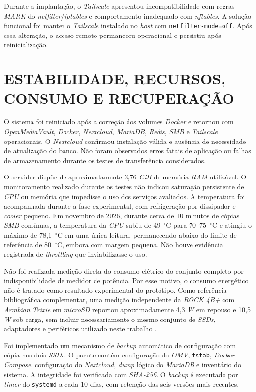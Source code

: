 Durante a implantação, o \textit{Tailscale} apresentou incompatibilidade com regras \textit{MARK} do \textit{netfilter}/\textit{iptables} e comportamento inadequado com \textit{nftables}. A solução funcional foi manter o \textit{Tailscale} instalado no \textit{host} com \texttt{netfilter-mode=off}. Após essa alteração, o acesso remoto permaneceu operacional e persistiu após reinicialização.

\section{ESTABILIDADE, RECURSOS, CONSUMO E RECUPERAÇÃO}

O sistema foi reiniciado após a correção dos volumes \textit{Docker} e retornou com \textit{OpenMediaVault}, \textit{Docker}, \textit{Nextcloud}, \textit{MariaDB}, \textit{Redis}, \textit{SMB} e \textit{Tailscale} operacionais. O \textit{Nextcloud} confirmou instalação válida e ausência de necessidade de atualização do banco. Não foram observados erros fatais de aplicação ou falhas de armazenamento durante os testes de transferência considerados.

O servidor dispõe de aproximadamente 3,76 \textit{GiB} de memória \textit{RAM} utilizável. O monitoramento realizado durante os testes não indicou saturação persistente de \textit{CPU} ou memória que impedisse o uso dos serviços avaliados. A temperatura foi acompanhada durante a fase experimental, com refrigeração por dissipador e \textit{cooler} pequeno. Em novembro de 2026, durante cerca de 10 minutos de cópias \textit{SMB} contínuas, a temperatura da \textit{CPU} subiu de 49~$^\circ$C para 70--75~$^\circ$C e atingiu o máximo de 78,1~$^\circ$C em uma única leitura, permanecendo abaixo do limite de referência de 80~$^\circ$C, embora com margem pequena. Não houve evidência registrada de \textit{throttling} que inviabilizasse o uso.

Não foi realizada medição direta do consumo elétrico do conjunto completo por indisponibilidade de medidor de potência. Por esse motivo, o consumo energético não é tratado como resultado experimental do protótipo. Como referência bibliográfica complementar, uma medição independente da \textit{ROCK 4B+} com \textit{Armbian Trixie} em \textit{microSD} reportou aproximadamente 4,3 \textit{W} em repouso e 10,5 \textit{W} sob carga, sem incluir necessariamente o mesmo conjunto de \textit{SSDs}, adaptadores e periféricos utilizado neste trabalho \cite{sbc2026}.

Foi implementado um mecanismo de \textit{backup} automático de configuração com cópia nos dois \textit{SSDs}. O pacote contém configuração do \textit{OMV}, \texttt{fstab}, \textit{Docker Compose}, configuração do \textit{Nextcloud}, \textit{dump} lógico do \textit{MariaDB} e inventário do sistema. A integridade foi verificada com \textit{SHA-256}. O \textit{backup} é executado por \textit{timer} do \texttt{systemd} a cada 10 dias, com retenção das seis versões mais recentes.

